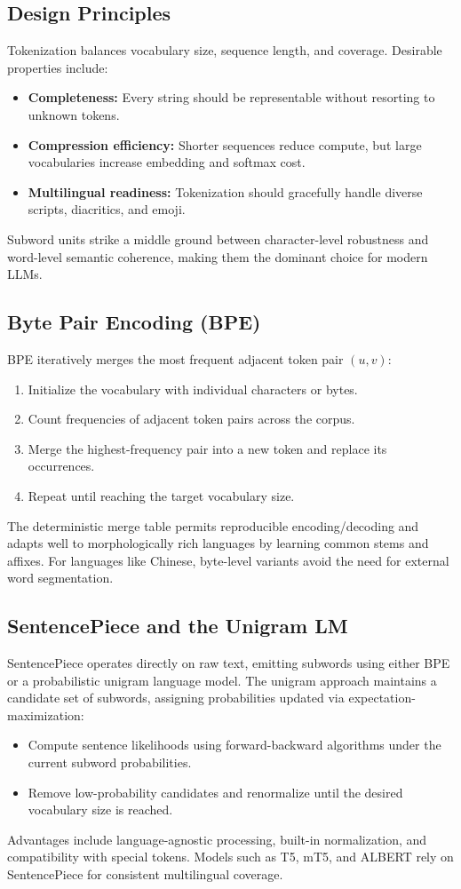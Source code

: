 \documentclass{article}
\begin{document}
\subsection{Design Principles}
Tokenization balances vocabulary size, sequence length, and coverage. Desirable properties include:
\begin{itemize}
  \item \textbf{Completeness:} Every string should be representable without resorting to unknown tokens.
  \item \textbf{Compression efficiency:} Shorter sequences reduce compute, but large vocabularies increase embedding and softmax cost.
  \item \textbf{Multilingual readiness:} Tokenization should gracefully handle diverse scripts, diacritics, and emoji.
\end{itemize}
Subword units strike a middle ground between character-level robustness and word-level semantic coherence, making them the dominant choice for modern LLMs.

\subsection{Byte Pair Encoding (BPE)}
BPE iteratively merges the most frequent adjacent token pair $(u, v)$:
\begin{enumerate}
  \item Initialize the vocabulary with individual characters or bytes.
  \item Count frequencies of adjacent token pairs across the corpus.
  \item Merge the highest-frequency pair into a new token and replace its occurrences.
  \item Repeat until reaching the target vocabulary size.
\end{enumerate}
The deterministic merge table permits reproducible encoding/decoding and adapts well to morphologically rich languages by learning common stems and affixes. For languages like Chinese, byte-level variants avoid the need for external word segmentation.

\subsection{SentencePiece and the Unigram LM}
SentencePiece operates directly on raw text, emitting subwords using either BPE or a probabilistic unigram language model. The unigram approach maintains a candidate set of subwords, assigning probabilities updated via expectation-maximization:
\begin{itemize}
  \item Compute sentence likelihoods using forward-backward algorithms under the current subword probabilities.
  \item Remove low-probability candidates and renormalize until the desired vocabulary size is reached.
\end{itemize}
Advantages include language-agnostic processing, built-in normalization, and compatibility with special tokens. Models such as T5, mT5, and ALBERT rely on SentencePiece for consistent multilingual coverage.
\end{document}
